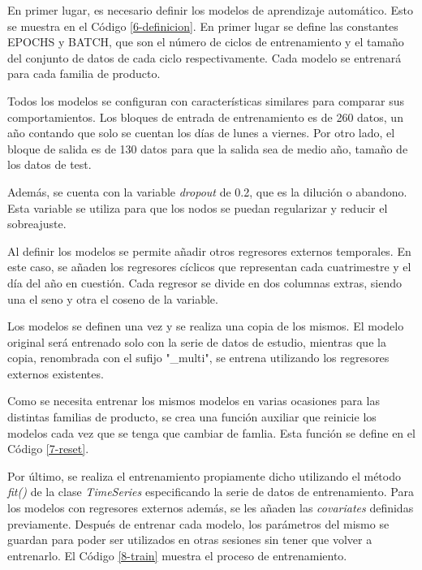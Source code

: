 En primer lugar, es necesario definir los modelos de aprendizaje automático. Esto se muestra en el Código \ref*{6-definicion}. En primer lugar se define las constantes EPOCHS y BATCH, que son el número de ciclos de entrenamiento y el tamaño del conjunto de datos de cada ciclo respectivamente. Cada modelo se entrenará para cada familia de producto.

Todos los modelos se configuran con características similares para comparar sus comportamientos. Los bloques de entrada de entrenamiento es de 260 datos, un año contando que solo se cuentan los días de lunes a viernes. Por otro lado, el bloque de salida es de 130 datos para que la salida sea de medio año, tamaño de los datos de test. 

Además, se cuenta con la variable \textit{dropout} de 0.2, que es la dilución o abandono. Esta variable se utiliza para que los nodos se puedan regularizar y reducir el sobreajuste.

Al definir los modelos se permite añadir otros regresores externos temporales. En este caso, se añaden los regresores cíclicos que representan cada cuatrimestre y el día del año en cuestión. Cada regresor se divide en dos columnas extras, siendo una el seno y otra el coseno de la variable. 

Los modelos se definen una vez y se realiza una copia de los mismos. El modelo original será entrenado solo con la serie de datos de estudio, mientras que la copia, renombrada con el sufijo "\_multi", se entrena utilizando los regresores externos existentes.



Como se necesita entrenar los mismos modelos en varias ocasiones para las distintas familias de producto, se crea una función auxiliar que reinicie los modelos cada vez que se tenga que cambiar de famlia. Esta función se define en el Código \ref*{7-reset}.



Por último, se realiza el entrenamiento propiamente dicho utilizando el método \textit{fit()} de la clase \textit{TimeSeries} especificando la serie de datos de entrenamiento. Para los modelos con regresores externos además, se les añaden las \textit{covariates} definidas previamente. Después de entrenar cada modelo, los parámetros del mismo se guardan para poder ser utilizados en otras sesiones sin tener que volver a entrenarlo. El Código \ref{8-train} muestra el proceso de entrenamiento. 

